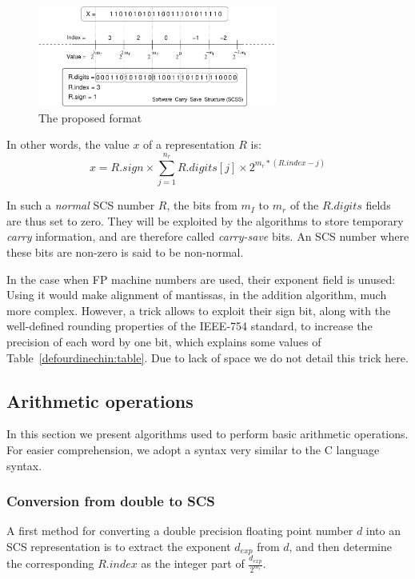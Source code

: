 \begin{figure}[h]
\begin{center}
\includegraphics[width=0.7\textwidth]{fig_scs/exponent_representation} %
\caption{The proposed format \label{fig:representation}}
\end{center}
\end{figure}
  
In other words, the value  $x$ of a representation $R$  is:
\begin{equation}
\label{defourdinechin:eqn4}
x = R.sign \times \sum_{j=1}^{n_r} R.digits[j] \times 2^{m_r * (R.index - j)}
\end{equation}

In such a \emph{normal} SCS number $R$, the bits from $m_I$ to $m_r$
of the $R.digits$ fields are thus set to zero. They will be exploited
by the algorithms to store temporary \emph{carry} information, and are
therefore called \emph{carry-save} bits. An SCS number where these
bits are non-zero is said to be non-normal.


In the case when FP machine numbers are used, their exponent field is
unused: Using it would make alignment of mantissas, in the addition
algorithm, much more complex. However, a trick allows to exploit their
sign bit, along with the well-defined rounding properties of the
IEEE-754 standard, to increase the precision of each word by one bit,
which explains some values of Table~\ref{defourdinechin:table}. Due to lack of space
we do not detail this trick here.


\subsection{Arithmetic operations\label{defourdinechin:sec:ops}}

In this section we present algorithms used to perform basic arithmetic
operations. For easier comprehension, we adopt a syntax very similar
to the C language syntax.

\subsubsection{Conversion from double to SCS}
 A first method for converting a double precision floating
point number $d$ into an SCS representation is to extract the
exponent $d_{exp}$ from $d$, and then determine the corresponding
$R.index$ as the integer part of
$\frac{d_{exp}}{2^{m_r}}$.

